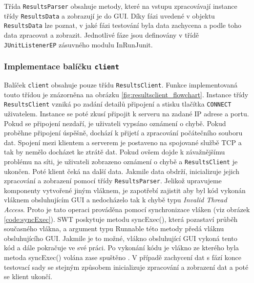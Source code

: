 

      Třída \texttt{ResultsParser} obsahuje metody, které na vstupu zpracovávají instance třídy \texttt{ResultsData} a zobrazují je do GUI. Díky fázi uvedené v objektu \texttt{ResultsData} lze poznat, v jaké fázi testování byla data zachycena a podle toho data zpracovat a zobrazit. Jednotlivé fáze jsou definovány v třídě \texttt{JUnitListenerEP} zásuvného modulu InRunJunit.
      

      \subsubsection{Implementace balíčku \texttt{client}}
      Balíček \texttt{client} obsahuje pouze třídu \texttt{ResultsClient}. Funkce implementovaná touto třídou je znázorněna na obrázku \ref{fig:resultsclient_flowchart}. Instance třídy \texttt{ResultsClient} vzniká po zadání detailů připojení a stisku tlačítka \texttt{CONNECT} uživatelem. Instance se poté zkusí připojit k serveru na zadané IP adrese a portu. Pokud se připojení nezdaří, je uživateli vypsáno oznámení o chybě. Pokud proběhne připojení úspěšně, dochází k přijetí a zpracování počátečního souboru dat. Spojení mezi klientem a serverem je postaveno na spojované službě TCP a tak by nemělo docházet ke ztrátě dat. Pokud ovšem dojde k závažnějšímu problému na síti, je uživateli zobrazeno oznámení o chybě a \texttt{ResultsClient} je ukončen. Poté klient čeká na další data. Jakmile data obdrží, inicializuje jejich zpracování a zobrazení pomocí třídy \texttt{ResultsParser}. Jelikož upravujeme komponenty vytvořené jiným vláknem, je zapotřebí zajistit aby byl kód vykonán vláknem obsluhujícím GUI a nedocházelo tak k chybě typu \emph{Invalid Thread Access}. Proto je tato operaci prováděna pomocí synchronizace vláken (viz obrázek \ref{code:syncExec}). SWT poskytuje metodu syncExec(), která pozastaví průběh současného vlákna, a argument typu Runnable této metody předá vláknu obsluhujícího GUI. Jakmile je to možné, vlákno obsluhující GUI vykoná tento kód a dále pokračuje ve své práci. Po vykonání kódu je vlákno ze kterého byla metoda syncExec() volána zase spuštěno \cite{codeaffine-asyncexec}. V případě zachycení dat s fází konce testovací sady se stejným způsobem inicializuje zpracování a zobrazení dat a poté se klient ukončí.
      
